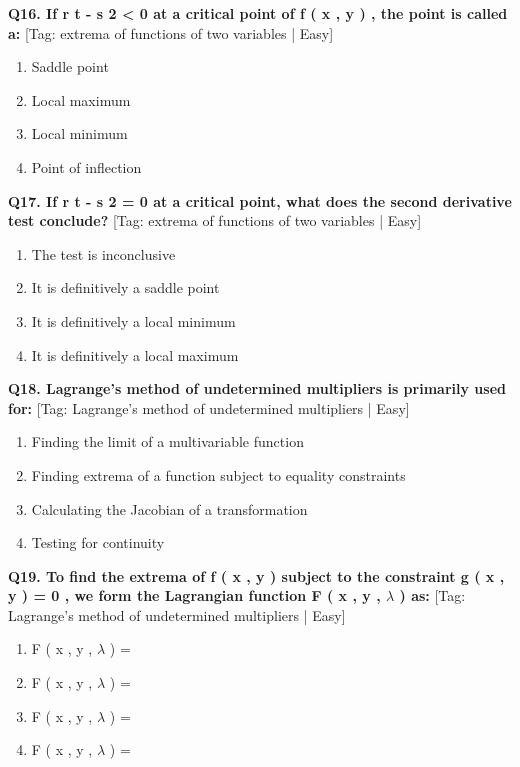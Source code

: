 \noindent\textbf{Q16. If r t - s 2 < 0 at a critical point of f ( x , y ) , the point is called a:} \hfill [Tag: extrema of functions of two variables | Easy]
\begin{enumerate}[label=(\alph*),topsep=2pt,itemsep=1pt,partopsep=0pt,parsep=0pt]
    \item {{Saddle point}}
    \item {{Local maximum}}
    \item {{Local minimum}}
    \item {{Point of inflection}}
\end{enumerate}
\vspace{2mm}

\noindent\textbf{Q17. If r t - s 2 = 0 at a critical point, what does the second derivative test conclude?} \hfill [Tag: extrema of functions of two variables | Easy]
\begin{enumerate}[label=(\alph*),topsep=2pt,itemsep=1pt,partopsep=0pt,parsep=0pt]
    \item {{The test is inconclusive}}
    \item {{It is definitively a saddle point}}
    \item {{It is definitively a local minimum}}
    \item {{It is definitively a local maximum}}
\end{enumerate}
\vspace{2mm}

\noindent\textbf{Q18. Lagrange's method of undetermined multipliers is primarily used for:} \hfill [Tag: Lagrange's method of undetermined multipliers | Easy]
\begin{enumerate}[label=(\alph*),topsep=2pt,itemsep=1pt,partopsep=0pt,parsep=0pt]
    \item {{Finding the limit of a multivariable function}}
    \item {{Finding extrema of a function subject to equality constraints}}
    \item {{Calculating the Jacobian of a transformation}}
    \item {{Testing for continuity}}
\end{enumerate}
\vspace{2mm}

\noindent\textbf{Q19. To find the extrema of f ( x , y ) subject to the constraint g ( x , y ) = 0 , we form the Lagrangian function F ( x , y , $\lambda$ ) as:} \hfill [Tag: Lagrange's method of undetermined multipliers | Easy]
\begin{enumerate}[label=(\alph*),topsep=2pt,itemsep=1pt,partopsep=0pt,parsep=0pt]
    \item {{F ( x , y , $\lambda$ ) =}}
    \item {{F ( x , y , $\lambda$ ) =}}
    \item {{F ( x , y , $\lambda$ ) =}}
    \item {{F ( x , y , $\lambda$ ) =}}
\end{enumerate}
\vspace{2mm}

